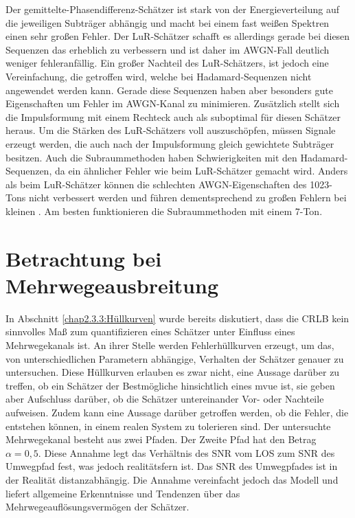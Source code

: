 Der gemittelte-Phasendifferenz-Schätzer ist stark von der Energieverteilung auf die jeweiligen Subträger abhängig und macht bei einem fast weißen Spektren einen sehr großen Fehler. Der \gls{LuR}-Schätzer schafft es allerdings gerade bei diesen Sequenzen das  erheblich zu verbessern und ist daher im \gls{AWGN}-Fall deutlich weniger fehleranfällig. Ein großer Nachteil des \gls{LuR}-Schätzers, ist jedoch eine Vereinfachung, die getroffen wird, welche bei Hadamard-Sequenzen nicht angewendet werden kann. Gerade diese Sequenzen haben aber besonders gute Eigenschaften um Fehler im \gls{AWGN}-Kanal zu minimieren.
Zusätzlich stellt sich die Impulsformung mit einem Rechteck auch als suboptimal für diesen Schätzer heraus. Um die Stärken des \gls{LuR}-Schätzers voll auszuschöpfen, müssen Signale erzeugt werden, die auch nach der Impulsformung gleich gewichtete Subträger besitzen.    
Auch die Subraummethoden haben Schwierigkeiten mit den Hadamard-Sequenzen, da ein ähnlicher Fehler wie beim \gls{LuR}-Schätzer gemacht wird. Anders als beim \gls{LuR}-Schätzer können die schlechten \gls{AWGN}-Eigenschaften des 1023-Tons nicht verbessert werden und führen dementsprechend zu großen Fehlern bei kleinen . Am besten funktionieren die Subraummethoden mit einem 7-Ton. 

\section{Betrachtung bei Mehrwegeausbreitung}
\label{chap5.2:Mehrwege}
In Abschnitt \ref{chap2.3.3:Hüllkurven} wurde bereits diskutiert, dass die \gls{CRLB} kein sinnvolles Maß zum quantifizieren eines Schätzer unter Einfluss eines Mehrwegekanals ist. An ihrer Stelle werden Fehlerhüllkurven erzeugt, um das, von unterschiedlichen Parametern abhängige, Verhalten der Schätzer genauer zu untersuchen. Diese Hüllkurven erlauben es zwar nicht, eine Aussage darüber zu treffen, ob ein Schätzer der Bestmögliche hinsichtlich eines \gls{mvue} ist, sie geben aber Aufschluss darüber, ob die Schätzer untereinander Vor- oder Nachteile aufweisen. Zudem kann eine Aussage darüber getroffen werden, ob die Fehler, die entstehen können, in einem realen System zu tolerieren sind. Der untersuchte Mehrwegekanal besteht aus zwei Pfaden. Der Zweite Pfad hat den Betrag $\alpha = 0,5$. Diese Annahme legt das Verhältnis des \gls{SNR} vom \gls{LOS} zum \gls{SNR} des Umwegpfad fest, was jedoch realitätsfern ist. Das \gls{SNR} des Umwegpfades ist in der Realität distanzabhängig. Die Annahme vereinfacht jedoch das Modell und liefert allgemeine Erkenntnisse und Tendenzen über das Mehrwegeauflösungsvermögen der Schätzer.

